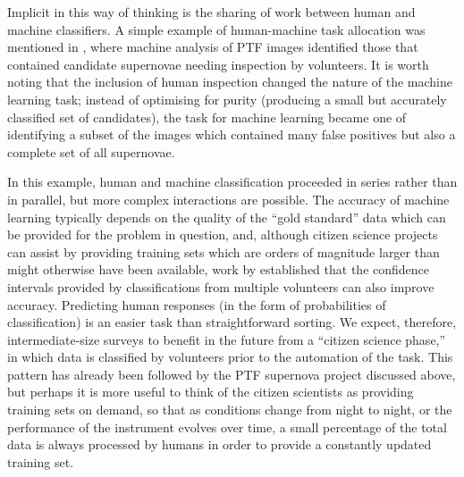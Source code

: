 \documentclass{ar2e}
\begin{document}
Implicit in this way of thinking is the sharing of work between human and
machine classifiers. 
A simple example of human-machine task allocation was mentioned in
, where machine analysis of PTF images identified those
that contained candidate supernovae needing inspection by volunteers. It is
worth noting that the inclusion of human inspection changed the nature of the
machine learning task; instead of optimising for purity (producing a small but
accurately classified set of candidates), the task for machine learning became
one of identifying a subset of the images which contained many false positives
but also a complete set of all supernovae. 

In this example, human and machine classification proceeded in series rather
than in parallel, but more complex interactions are possible. The accuracy of
machine learning typically depends on the quality of the ``gold standard'' data
which can be provided for the problem in question, and, although citizen science
projects can assist by providing training sets which are orders of magnitude
larger than might otherwise have been available, work by \citet{Banerji}
established that the confidence intervals provided by classifications from
multiple volunteers can also improve accuracy. Predicting human responses (in
the form of probabilities of classification) is an easier task than
straightforward sorting. We expect, therefore, intermediate-size surveys to
benefit in the future from a ``citizen science phase,'' in which data is
classified by volunteers prior to the automation of the task. This pattern has
already been followed by the PTF supernova project discussed above, but perhaps
it is more useful to think of the citizen scientists as providing training sets
on demand, so that as conditions change from night to night, or the performance
of the instrument evolves over time, a small percentage of the total data is
always processed by humans in order to provide a constantly updated training
set. 
\end{document}
